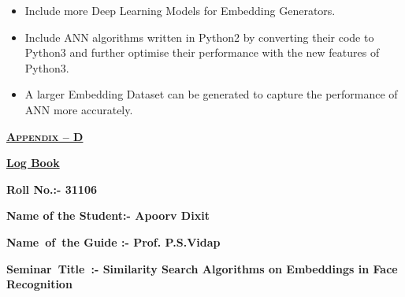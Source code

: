 \documentclass[12pt]{article}
\renewcommand{\_}{\kern-1.5pt\textunderscore\kern-1.5pt}
\begin{document}
\setlength{\parskip}{0.0pt}
\begin{itemize}
	\item Include more Deep Learning Models for Embedding Generators.\par

	\item Include ANN algorithms written in Python2 by converting their code to Python3 and further optimise their performance with the new features of Python3.\par

	\item A larger Embedding Dataset can be generated to capture the performance of ANN more accurately.
\end{itemize}\par

\newpage
\printbibliography

\setlength{\parskip}{6.0pt}



\newpage

\vspace{\baselineskip}
\vspace{\baselineskip}
\begin{Center}
\textbf{\textsc{\uline{Appendix – D}}}
\end{Center}\par

\begin{Center}
{\fontsize{14pt}{16.8pt}\selectfont \textbf{\uline{Log Book }}\par}
\end{Center}\par

{\fontsize{14pt}{16.8pt}\selectfont \textbf{Roll No.\tab \tab \tab :- 31106}\par}\par

{\fontsize{14pt}{16.8pt}\selectfont \textbf{Name of the Student\tab :- Apoorv Dixit}\par}\par

{\fontsize{14pt}{16.8pt}\selectfont \textbf{Name\ of\ the Guide   \tab :- Prof. P.S.Vidap}\par}\par

{\fontsize{14pt}{16.8pt}\selectfont \textbf{Seminar\ Title\   \tab \tab :- Similarity Search Algorithms on Embeddings in Face Recognition}\par}\par
\end{document}
